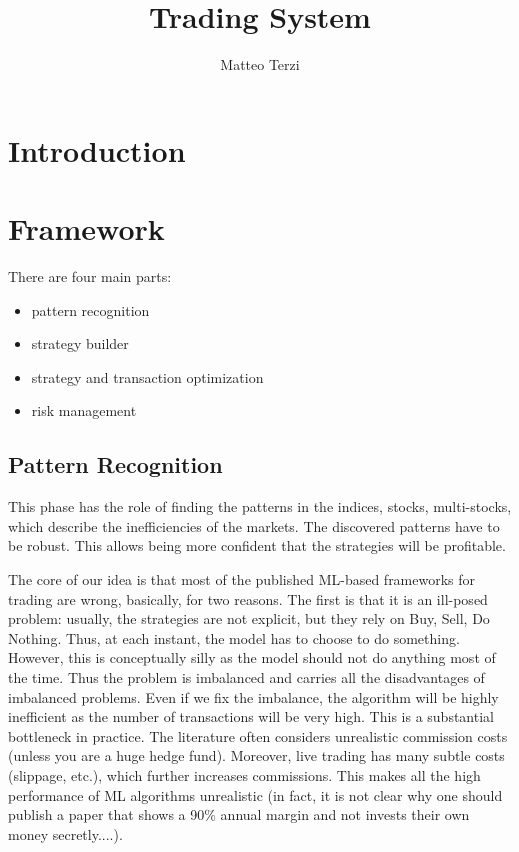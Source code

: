 \documentclass{article}[10pt]
\title{\textbf{\Huge Trading System}}
\author{Matteo Terzi}
\date{}
\begin{document}
\maketitle 
\tableofcontents

\section{Introduction}

\section{Framework}

There are four main parts:
\begin{itemize}
	\item pattern recognition
	\item strategy builder
	\item strategy and transaction optimization 
	\item risk management
\end{itemize}


\subsection{Pattern Recognition}

This phase has the role of finding the patterns in the indices, stocks, multi-stocks, which describe the inefficiencies of the markets. 
The discovered patterns have to be robust. This allows being more confident that the strategies will be profitable. 

The core of our idea is that most of the published ML-based frameworks for trading are wrong, basically, for two reasons. The first is that it is an ill-posed problem: usually, the strategies are not explicit, but they rely on Buy, Sell, Do Nothing.
Thus, at each instant, the model has to choose to do something. However, this is conceptually silly as the model should not do anything most of the time. Thus the problem is imbalanced and carries all the disadvantages of imbalanced problems. 
Even if we fix the imbalance, the algorithm will be highly inefficient as the number of transactions will be very high. This is a substantial bottleneck in practice. The literature often considers unrealistic commission costs (unless you are a huge hedge fund). Moreover, live trading has many subtle costs (slippage, etc.), which further increases commissions. 
 This makes all the high performance of ML algorithms unrealistic (in fact, it is not clear why one should publish a paper that shows a 90\% annual margin and not invests their own money secretly....).
 
\end{document}
